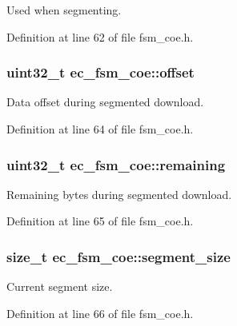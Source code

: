Used when segmenting. 



Definition at line 62 of file fsm\-\_\-coe.\-h.

\subsubsection[{offset}]{\setlength{\rightskip}{0pt plus 5cm}uint32\-\_\-t ec\-\_\-fsm\-\_\-coe\-::offset}\label{structec__fsm__coe_ae6154dddb5d2a111661d2ecbc866a66d}


Data offset during segmented download. 



Definition at line 64 of file fsm\-\_\-coe.\-h.

\subsubsection[{remaining}]{\setlength{\rightskip}{0pt plus 5cm}uint32\-\_\-t ec\-\_\-fsm\-\_\-coe\-::remaining}\label{structec__fsm__coe_a90921faef4f8ccada6bf621357f070d2}


Remaining bytes during segmented download. 



Definition at line 65 of file fsm\-\_\-coe.\-h.

\subsubsection[{segment\-\_\-size}]{\setlength{\rightskip}{0pt plus 5cm}size\-\_\-t ec\-\_\-fsm\-\_\-coe\-::segment\-\_\-size}\label{structec__fsm__coe_ad25b5b2158356b9ed09fe6d3cd21b99c}


Current segment size. 



Definition at line 66 of file fsm\-\_\-coe.\-h.

